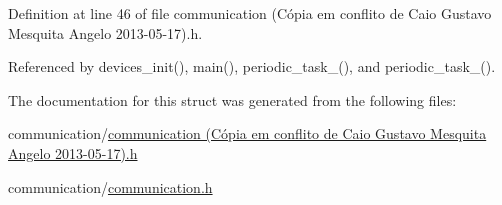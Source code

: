 Definition at line 46 of file communication (\-Cópia em conflito de Caio Gustavo Mesquita Angelo 2013-\/05-\/17).\-h.



Referenced by devices\-\_\-init(), main(), periodic\-\_\-task\-\_(), and periodic\-\_\-task\-\_().



The documentation for this struct was generated from the following files\-:\begin{DoxyCompactItemize}
\item 
communication/\hyperlink{communication_01_07C_xC3_xB3pia_01em_01conflito_01de_01Caio_01Gustavo_01Mesquita_01Angelo_012013-05-17_08_8h}{communication (\-Cópia em conflito de Caio Gustavo Mesquita Angelo 2013-\/05-\/17).\-h}\item 
communication/\hyperlink{communication_2communication_8h}{communication.\-h}\end{DoxyCompactItemize}
